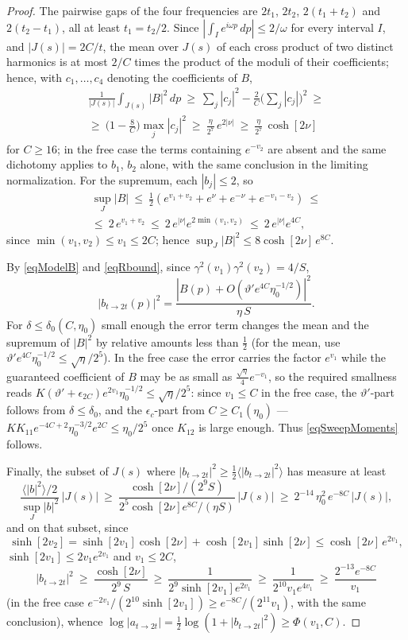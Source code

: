 \documentclass[10pt,a4paper]{amsart}
\def\d{\delta}
\def\g{\gamma}
\def\to{\rightarrow}
\begin{document}
\begin{proof}
The pairwise gaps of the four frequencies are $2t_1$, $2t_2$, $2(t_1+t_2)$ and $2(t_2-t_1)$, all at least $t_1=t_2/2$. Since $\left|\int_Ie^{i\omega p}\,dp\right|\leq2/\omega$ for every interval $I$, and $|J(s)|=2C/t$, the mean over $J(s)$ of each cross product of two distinct harmonics is at most $2/C$ times the product of the moduli of their coefficients; hence, with $c_1,\dots,c_4$ denoting the coefficients of $B$,
\begin{multline*}\frac1{|J(s)|}\int_{J(s)}|B|^2\,dp\ \geq\ \sum_j|c_j|^2-\frac 2C\Big(\sum_j|c_j|\Big)^2\ \geq\\ \geq\ \Big(1-\frac{8}C\Big)\max_j|c_j|^2\ \geq\ \frac{\eta}{2^7}\,e^{2|\nu|}\ \geq\ \frac{\eta}{2^7}\,\cosh[2\nu]\end{multline*}
for $C\geq16$; in the free case the terms containing $e^{-v_2}$ are absent and the same dichotomy applies to $b_1$, $b_2$ alone, with the same conclusion in the limiting normalization. For the supremum, each $|b_j|\leq2$, so
\begin{multline*}\sup_J|B|\ \leq\ \frac12\left(e^{v_1+v_2}+e^{\nu}+e^{-\nu}+e^{-v_1-v_2}\right)\ \leq\\ \leq\ 2\,e^{v_1+v_2}\ \leq\ 2\,e^{|\nu|}e^{2\min(v_1,v_2)}\ \leq\ 2\,e^{|\nu|}e^{4C},\end{multline*}
since $\min(v_1,v_2)\leq v_1\leq2C$; hence $\sup_J|B|^2\leq8\cosh[2\nu]\,e^{8C}$.

By \eqref{eqModelB} and \eqref{eqRbound}, since $\g^2(v_1)\g^2(v_2)=4/S$,
$$|b_{t\to2t}(p)|^2=\frac{\left|B(p)+O(\vartheta'e^{4C}\eta_0^{-1/2})\right|^2}{\eta\,S}.$$
For $\d\leq\d_0(C,\eta_0)$ small enough the error term changes the mean and the supremum of $|B|^2$ by relative amounts less than $\tfrac12$ (for the mean, use $\vartheta'e^{4C}\eta_0^{-1/2}\leq\sqrt\eta/2^5$). In the free case the error carries the factor $e^{v_1}$ while the guaranteed coefficient of $B$ may be as small as $\tfrac{\sqrt\eta}4e^{-v_1}$, so the required smallness reads $K\left(\vartheta'+\epsilon_{2C}\right)e^{2v_1}\eta_0^{-1/2}\leq\sqrt\eta/2^5$: since $v_1\leq C$ in the free case, the $\vartheta'$-part follows from $\d\leq\d_0$, and the $\epsilon_c$-part from $C\geq C_1(\eta_0)$ --- $KK_{11}e^{-4C+2}\eta_0^{-3/2}e^{2C}\leq\eta_0/2^5$ once $K_{12}$ is large enough. Thus \eqref{eqSweepMoments} follows.

Finally, the subset of $J(s)$ where $|b_{t\to2t}|^2\geq\frac12\langle|b_{t\to2t}|^2\rangle$ has measure at least
$$\frac{\langle|b|^2\rangle/2}{\sup_J|b|^2}\,|J(s)|\ \geq\ \frac{\cosh[2\nu]/(2^9S)}{2^5\cosh[2\nu]e^{8C}/(\eta S)}\,|J(s)|\ \geq\ 2^{-14}\,\eta_0^2\,e^{-8C}\,|J(s)| ,$$
and on that subset, since
$$\sinh[2v_2]=\sinh[2v_1]\cosh[2\nu]+\cosh[2v_1]\sinh[2\nu]\leq\cosh[2\nu]\,e^{2v_1},$$
$\sinh[2v_1]\leq2v_1e^{2v_1}$ and $v_1\leq2C$,
$$|b_{t\to2t}|^2\ \geq\ \frac{\cosh[2\nu]}{2^9\,S}\ \geq\ \frac1{2^9\sinh[2v_1]e^{2v_1}}\ \geq\ \frac1{2^{10}v_1e^{4v_1}}\ \geq\ \frac{2^{-13}e^{-8C}}{v_1}$$
(in the free case $e^{-2v_1}/(2^{10}\sinh[2v_1])\geq e^{-8C}/(2^{11}v_1)$, with the same conclusion), whence
$\log|a_{t\to2t}|=\frac12\log(1+|b_{t\to2t}|^2)\geq\Phi(v_1,C)$.
\end{proof}
\end{document}
